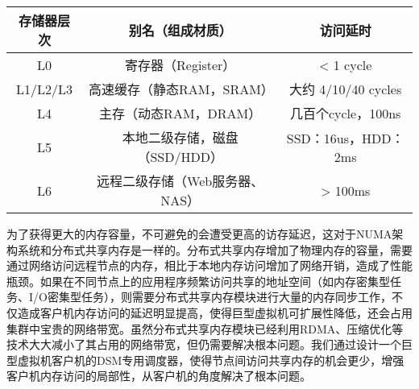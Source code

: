 \begin{table}[!htpb]
  \label{tab:level}
  \centering
  \begin{threeparttable}[b]
     \begin{tabular}{c|c|c}
      \toprule
      存储器层次 & 别名（组成材质） & 访问延时 \\
      \midrule[1pt]
      L0 & 寄存器（Register）& < 1 cycle \\
      \hline
      L1/L2/L3 & 高速缓存（静态RAM，SRAM）& 大约 4/10/40 cycles \\
      \hline
      L4 & 主存（动态RAM，DRAM） & 几百个cycle，100ns \\
      \hline
      L5 & 本地二级存储，磁盘（SSD/HDD）& SSD：16us，HDD：2ms \\
      \hline
      L6 & 远程二级存储（Web服务器、NAS） & > 100ms \\
      \bottomrule
    \end{tabular}
  \end{threeparttable}
\end{table}


为了获得更大的内存容量，不可避免的会遭受更高的访存延迟，这对于NUMA架构系统和分布式共享内存是一样的。分布式共享内存增加了物理内存的容量，需要通过网络访问远程节点的内存，相比于本地内存访问增加了网络开销，造成了性能瓶颈。如果在不同节点上的应用程序频繁访问共享的地址空间（如内存密集型任务、I/O密集型任务），则需要分布式共享内存模块进行大量的内存同步工作，不仅造成客户机内存访问的延迟明显提高，使得巨型虚拟机可扩展性降低，还会占用集群中宝贵的网络带宽。虽然分布式共享内存模块已经利用RDMA、压缩优化等技术大大减小了其占用的网络带宽，但仍需要解决根本问题。我们通过设计一个巨型虚拟机客户机的DSM专用调度器，使得节点间访问共享内存的机会更少，增强客户机内存访问的局部性，从客户机的角度解决了根本问题。

